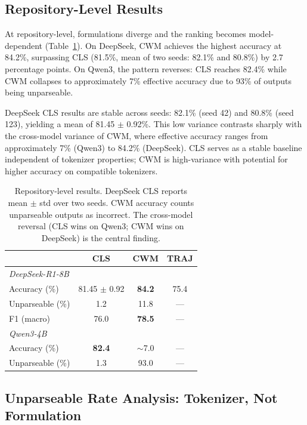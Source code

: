 \documentclass[11pt,a4paper]{article}
\begin{document}
\subsection{Repository-Level Results}
\label{sec:repo}

At repository-level, formulations diverge and the ranking becomes model-dependent (Table~\ref{tab:repo}).
On DeepSeek, CWM achieves the highest accuracy at 84.2\%, surpassing CLS (81.5\%, mean of two seeds: 82.1\% and 80.8\%) by 2.7 percentage points.
On Qwen3, the pattern reverses: CLS reaches 82.4\% while CWM collapses to approximately 7\% effective accuracy due to 93\% of outputs being unparseable.

DeepSeek CLS results are stable across seeds: 82.1\% (seed 42) and 80.8\% (seed 123), yielding a mean of 81.45 $\pm$ 0.92\%.
This low variance contrasts sharply with the cross-model variance of CWM, where effective accuracy ranges from approximately 7\% (Qwen3) to 84.2\% (DeepSeek).
CLS serves as a stable baseline independent of tokenizer properties; CWM is high-variance with potential for higher accuracy on compatible tokenizers.

\begin{table}[t]
\centering
\small
\caption{Repository-level results. DeepSeek CLS reports mean $\pm$ std over two seeds. CWM accuracy counts unparseable outputs as incorrect. The cross-model reversal (CLS wins on Qwen3; CWM wins on DeepSeek) is the central finding.}
\label{tab:repo}
\begin{tabular}{lccc}
\toprule
& \textbf{CLS} & \textbf{CWM} & \textbf{TRAJ} \\
\midrule
\multicolumn{4}{l}{\textit{DeepSeek-R1-8B}} \\
\quad Accuracy (\%) & 81.45 $\pm$ 0.92 & \textbf{84.2} & 75.4 \\
\quad Unparseable (\%) & 1.2 & 11.8 & --- \\
\quad F1 (macro) & 76.0 & \textbf{78.5} & --- \\
\midrule
\multicolumn{4}{l}{\textit{Qwen3-4B}} \\
\quad Accuracy (\%) & \textbf{82.4} & $\sim$7.0 & --- \\
\quad Unparseable (\%) & 1.3 & 93.0 & --- \\
\bottomrule
\end{tabular}
\end{table}

\subsection{Unparseable Rate Analysis: Tokenizer, Not Formulation}
\label{sec:unparseable}
\end{document}
